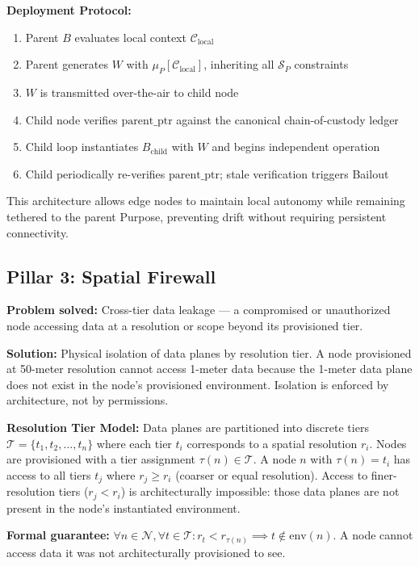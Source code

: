 \documentclass[12pt]{article}
\begin{document}
\textbf{Deployment Protocol:}
\begin{enumerate}
\item Parent $B$ evaluates local context $\mathcal{C}_{\text{local}}$
\item Parent generates $W$ with $\mu_P[\mathcal{C}_{\text{local}}]$, inheriting all $\mathcal{S}_P$ constraints
\item $W$ is transmitted over-the-air to child node
\item Child node verifies $\text{parent\_ptr}$ against the canonical chain-of-custody ledger
\item Child loop instantiates $B_{\text{child}}$ with $W$ and begins independent operation
\item Child periodically re-verifies $\text{parent\_ptr}$; stale verification triggers Bailout
\end{enumerate}

This architecture allows edge nodes to maintain local autonomy while remaining tethered to the parent Purpose, preventing drift without requiring persistent connectivity.

\subsection{Pillar 3: Spatial Firewall}
\textbf{Problem solved:} Cross-tier data leakage --- a compromised or unauthorized node accessing data at a resolution or scope beyond its provisioned tier.

\textbf{Solution:} Physical isolation of data planes by resolution tier. A node provisioned at 50-meter resolution cannot access 1-meter data because the 1-meter data plane does not exist in the node's provisioned environment. Isolation is enforced by architecture, not by permissions.

\textbf{Resolution Tier Model:} Data planes are partitioned into discrete tiers $\mathcal{T} = \{t_1, t_2, \ldots, t_n\}$ where each tier $t_i$ corresponds to a spatial resolution $r_i$. Nodes are provisioned with a tier assignment $\tau(n) \in \mathcal{T}$. A node $n$ with $\tau(n) = t_i$ has access to all tiers $t_j$ where $r_j \geq r_i$ (coarser or equal resolution). Access to finer-resolution tiers ($r_j < r_i$) is architecturally impossible: those data planes are not present in the node's instantiated environment.

\textbf{Formal guarantee:} $\forall n \in \mathcal{N}, \forall t \in \mathcal{T}: r_t < r_{\tau(n)} \implies t \notin \text{env}(n)$. A node cannot access data it was not architecturally provisioned to see.
\end{document}
